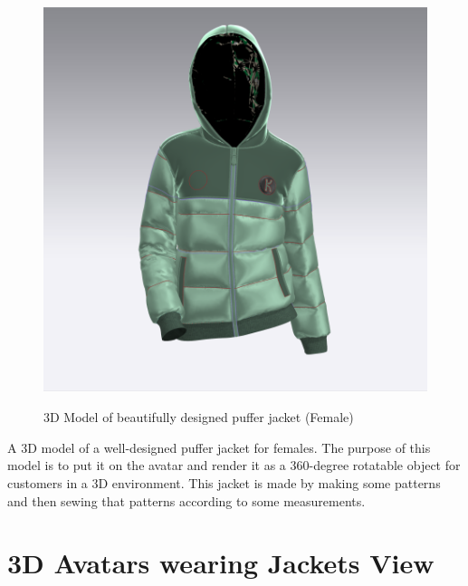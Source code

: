 \begin{figure}[H]
    \centering
    \includegraphics[width=13cm,height=12cm]{Figures/3DJackets/female4.png}
    \caption{3D Model of beautifully designed puffer jacket (Female)}
    \label{3D Model of beautifully designed puffer jacket (Female)}
  
\end{figure}
\justifying
A 3D model of a well-designed puffer jacket for females. The purpose of this model is to put it on the avatar and render it as a 360-degree rotatable object for customers in a 3D environment. This jacket is made by making some patterns and then sewing that patterns according to some measurements.
\section{3D Avatars wearing Jackets View}
